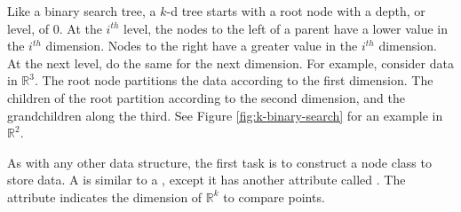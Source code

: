 Like a binary search tree, a $k$-d tree starts with a root node with a depth, or level, of 0.
At the $i^{th}$ level, the nodes to the left of a parent have a lower value in the $i^{th}$ dimension.
Nodes to the right have a greater value in the $i^{th}$ dimension.
At the next level, do the same for the next dimension.
For example, consider data in $\mathbb{R}^3$.
The root node partitions the data according to the first dimension.
The children of the root partition according to the second dimension, and the grandchildren along the third.
See Figure \ref{fig:k-binary-search} for an example in $\mathbb{R}^2$.

As with any other data structure, the first task is to construct a node class to store data.
A  is similar to a , except it has another attribute called .
The  attribute indicates the dimension of $\mathbb{R}^k$ to compare points.

